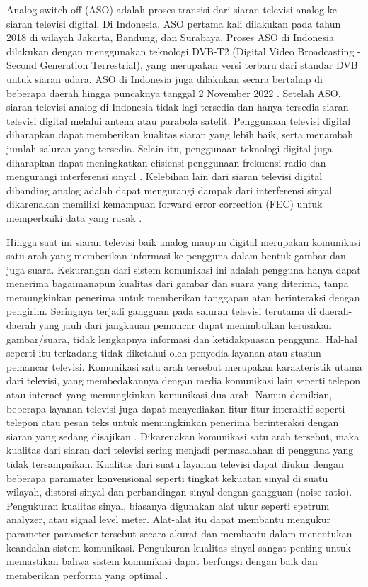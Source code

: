 Analog switch off (ASO) adalah proses transisi dari siaran televisi analog ke siaran televisi digital. Di Indonesia, ASO pertama kali dilakukan pada tahun 2018 di wilayah Jakarta, Bandung, dan Surabaya. Proses ASO di Indonesia dilakukan dengan menggunakan teknologi DVB-T2 (Digital Video Broadcasting - Second Generation Terrestrial), yang merupakan versi terbaru dari standar DVB untuk siaran udara. ASO di Indonesia juga dilakukan secara bertahap di beberapa daerah hingga puncaknya tanggal 2 November 2022 \citep{Kominfo2022}. Setelah ASO, siaran televisi analog di Indonesia tidak lagi tersedia dan hanya tersedia siaran televisi digital melalui antena atau parabola satelit. Penggunaan televisi digital diharapkan dapat memberikan kualitas siaran yang lebih baik, serta menambah jumlah saluran yang tersedia. Selain itu, penggunaan teknologi digital juga diharapkan dapat meningkatkan efisiensi penggunaan frekuensi radio dan mengurangi interferensi sinyal \citep{Gultom_2018}. Kelebihan lain dari siaran televisi digital dibanding analog adalah dapat mengurangi dampak dari interferensi sinyal dikarenakan memiliki kemampuan forward error correction  (FEC) untuk memperbaiki data yang rusak \citep{Dai2012}. 

Hingga saat ini siaran televisi baik analog maupun digital merupakan komunikasi satu arah yang memberikan informasi ke pengguna dalam bentuk gambar dan juga suara. Kekurangan dari sistem komunikasi ini adalah pengguna hanya dapat menerima bagaimanapun kualitas dari gambar dan suara yang diterima, tanpa memungkinkan penerima untuk memberikan tanggapan atau berinteraksi dengan pengirim. Seringnya terjadi gangguan pada saluran televisi terutama di daerah-daerah yang jauh dari jangkauan pemancar dapat menimbulkan kerusakan gambar/suara, tidak lengkapnya informasi dan ketidakpuasan pengguna. Hal-hal seperti itu terkadang tidak diketahui oleh penyedia layanan atau stasiun pemancar televisi. Komunikasi satu arah tersebut merupakan karakteristik utama dari televisi, yang membedakannya dengan media komunikasi lain seperti telepon atau internet yang memungkinkan komunikasi dua arah. Namun demikian, beberapa layanan televisi juga dapat menyediakan fitur-fitur interaktif seperti telepon atau pesan teks untuk memungkinkan penerima berinteraksi dengan siaran yang sedang disajikan \citep{HaH.Nguyen2009}. Dikarenakan komunikasi satu arah tersebut, maka kualitas dari siaran dari televisi sering menjadi permasalahan di pengguna yang tidak tersampaikan. Kualitas dari suatu layanan televisi dapat diukur dengan beberapa paramater konvensional seperti tingkat kekuatan sinyal di suatu wilayah, distorsi sinyal dan perbandingan sinyal dengan gangguan (noise ratio). Pengukuran kualitas sinyal, biasanya digunakan alat ukur seperti spetrum analyzer, atau signal level meter.  Alat-alat itu dapat membantu mengukur parameter-parameter tersebut secara akurat dan membantu dalam menentukan keandalan sistem komunikasi. Pengukuran kualitas sinyal sangat penting untuk memastikan bahwa sistem komunikasi dapat berfungsi dengan baik dan memberikan performa yang optimal \citep{GeorgeKennedy2009}.

